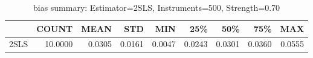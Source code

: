 \begin{table}[ht]
\centering
\caption{bias summary: Estimator=2SLS, Instruments=500, Strength=0.70}
\begin{tabular}{lrrrrrrrr}
\toprule
 & COUNT & MEAN & STD & MIN & 25\% & 50\% & 75\% & MAX \\
\midrule
2SLS & 10.0000 & 0.0305 & 0.0161 & 0.0047 & 0.0243 & 0.0301 & 0.0360 & 0.0555 \\
\bottomrule
\end{tabular}
\end{table}
